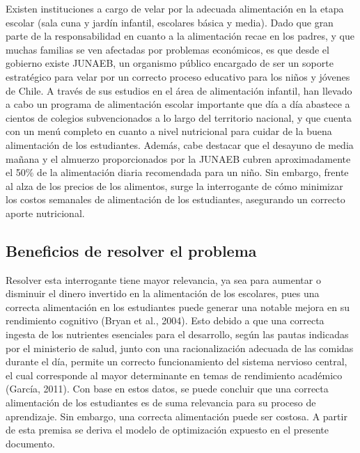\documentclass[letterpaper]{article}
\begin{document}
Existen instituciones a cargo de velar por la adecuada alimentación en la etapa escolar (sala cuna y jardín infantil, escolares básica y media). Dado que gran parte de la responsabilidad en cuanto a la alimentación recae en los padres, y que muchas familias se ven afectadas por problemas económicos, es que desde el gobierno existe JUNAEB, un organismo público encargado de ser un soporte estratégico para velar por un correcto proceso educativo para los niños y jóvenes de Chile. A través de sus estudios en el área de alimentación infantil, han llevado a cabo un programa de alimentación escolar importante que día a día abastece a cientos de colegios subvencionados a lo largo del territorio nacional, y que cuenta con un menú completo en cuanto a nivel nutricional para cuidar de la buena alimentación de los estudiantes. Además, cabe destacar que el desayuno de media mañana y el almuerzo proporcionados por la JUNAEB cubren aproximadamente el 50\% de la alimentación diaria recomendada para un niño. Sin embargo, frente al alza de los precios de los alimentos, surge la interrogante de cómo minimizar los costos semanales de alimentación de los estudiantes, asegurando un correcto aporte nutricional. 
    \subsection{Beneficios de resolver el problema}
    Resolver esta interrogante tiene mayor relevancia, ya sea para aumentar o disminuir el dinero invertido en la alimentación de los escolares, pues una correcta alimentación en los estudiantes puede generar una notable mejora en su rendimiento cognitivo (Bryan et al., 2004). Esto debido a que una correcta ingesta de los nutrientes esenciales para el desarrollo, según las pautas indicadas por el ministerio de salud, junto con una racionalización adecuada de las comidas durante el día, permite un correcto funcionamiento del sistema nervioso central, el cual corresponde al mayor determinante en temas de rendimiento académico (García, 2011). Con base en estos datos, se puede concluir que una correcta alimentación de los estudiantes es de suma relevancia para su proceso de aprendizaje. Sin embargo, una correcta alimentación puede ser costosa. A partir de esta premisa se deriva el modelo de optimización expuesto en el presente documento.\\
    
\end{document}
